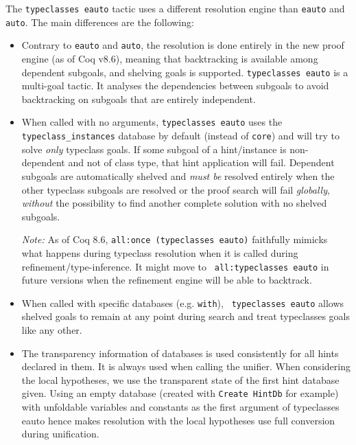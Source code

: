 The {\tt typeclasses eauto} tactic uses a different resolution engine
than {\tt eauto} and {\tt auto}. The main differences are the following:
\begin{itemize}
\item Contrary to {\tt eauto} and {\tt auto}, the resolution is done
  entirely in the new proof engine (as of Coq v8.6), meaning that
  backtracking is available among dependent subgoals, and shelving goals
  is supported. {\tt typeclasses eauto} is a multi-goal tactic.
  It analyses the dependencies between subgoals to avoid
  backtracking on subgoals that are entirely independent.
\item When called with no arguments, {\tt typeclasses eauto} uses the
  {\tt typeclass\_instances} database by default (instead of {\tt core})
  and will try to solve \emph{only} typeclass goals. If some subgoal of
  a hint/instance is non-dependent and not of class type, that hint
  application will fail. Dependent subgoals are automatically shelved
  and \emph{must be} resolved entirely when the other typeclass subgoals
  are resolved or the proof search will fail \emph{globally},
  \emph{without} the possibility to find another complete solution with
  no shelved subgoals.

  \emph{Note: } As of Coq 8.6, {\tt all:once (typeclasses eauto)}
  faithfully mimicks what happens during typeclass resolution when it is
  called during refinement/type-inference. It might move to {\tt
    all:typeclasses eauto} in future versions when the refinement engine
  will be able to backtrack.
\item When called with specific databases (e.g. {\tt with}), {\tt
    typeclasses eauto} allows shelved goals to remain at any point
  during search and treat typeclasses goals like any other.
\item The transparency information of databases is used consistently for
  all hints declared in them. It is always used when calling the unifier.
  When considering the local hypotheses, we use the transparent
  state of the first hint database given. Using an empty database
  (created with {\tt Create HintDb} for example) with 
  unfoldable variables and constants as the first argument of
  typeclasses eauto hence makes resolution with the local hypotheses use
  full conversion during unification.
\end{itemize}


